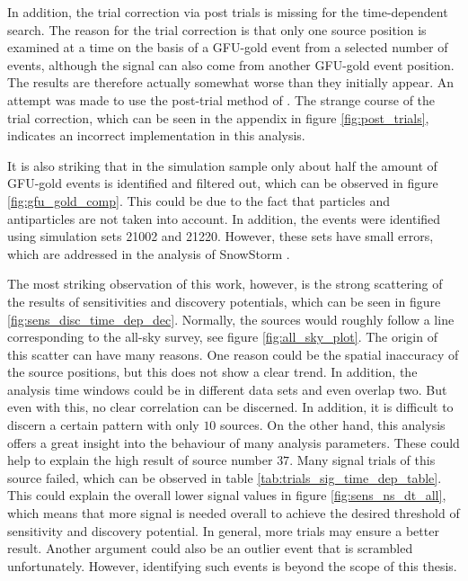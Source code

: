 In addition, the trial correction via post trials is missing for the time-dependent search.
The reason for the trial correction is that only one source position is examined at a time on the basis of a GFU-gold event from a selected number of events, although the signal can also come from another GFU-gold event position.
The results are therefore actually somewhat worse than they initially appear.
An attempt was made to use the post-trial method of \cite{thorben}.
The strange course of the trial correction, which can be seen in the appendix in figure \ref{fig:post_trials}, indicates an incorrect implementation in this analysis.

It is also striking that in the simulation sample only about half the amount of GFU-gold events is identified and filtered out, which can be observed in figure \ref{fig:gfu_gold_comp}.
This could be due to the fact that particles and antiparticles are not taken into account.
In addition, the events were identified using simulation sets 21002 and 21220. However, these sets have small errors, which are addressed in the analysis of SnowStorm \cite{snowstorm}.

The most striking observation of this work, however, is the strong scattering of the results of sensitivities and discovery potentials, which can be seen in figure \ref{fig:sens_disc_time_dep_dec}.
Normally, the sources would roughly follow a line corresponding to the all-sky survey, see figure \ref{fig:all_sky_plot}.
The origin of this scatter can have many reasons. One reason could be the spatial inaccuracy of the source positions, but this does not show a clear trend.
In addition, the analysis time windows could be in different data sets and even overlap two.
But even with this, no clear correlation can be discerned.
In addition, it is difficult to discern a certain pattern with only $\num{10}$ sources.
On the other hand, this analysis offers a great insight into the behaviour of many analysis parameters.
These could help to explain the high result of source number $\num{37}$.
Many signal trials of this source failed, which can be observed in table \ref{tab:trials_sig_time_dep_table}.
This could explain the overall lower signal values in figure \ref{fig:sens_ns_dt_all}, which means that more signal is needed overall to achieve the desired threshold of sensitivity and discovery potential.
In general, more trials may ensure a better result.
Another argument could also be an outlier event that is scrambled unfortunately.
However, identifying such events is beyond the scope of this thesis.

